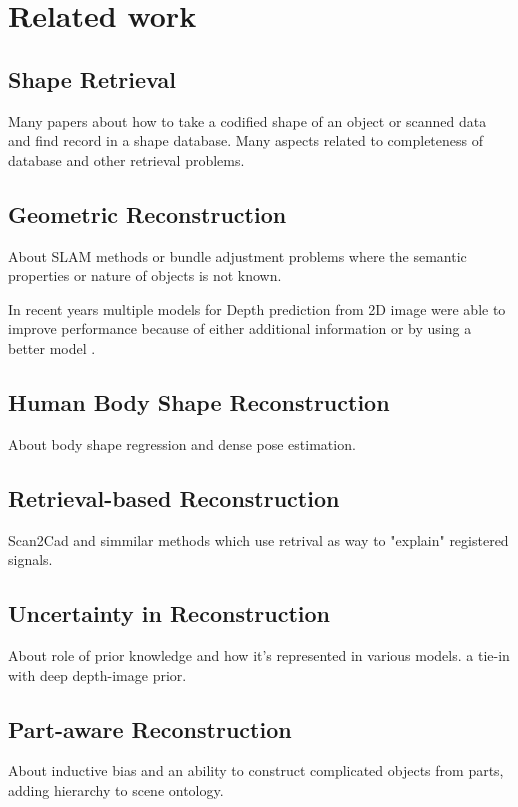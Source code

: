 \chapter{Related work}

\section{Shape Retrieval}
\label{sec:shape_retrieval}

Many papers about how to take a codified shape of an object or scanned data and find record in a shape database. Many aspects related to completeness of database and other retrieval problems.




\section{Geometric Reconstruction}
\label{sec:geometric_reconstruction}

About SLAM methods or bundle adjustment problems where the semantic properties or nature of objects is not known.

In recent years multiple models for Depth prediction from 2D image were able to improve performance because of either additional information or by using a better model \cite{jiao2018look,tatarchenko2019single,kendall2018multi}.

\section{Human Body Shape Reconstruction}
\label{sec:body_reconstruction}

About body shape regression and dense pose estimation.



\section{Retrieval-based Reconstruction}
\label{sec:retrieval_reconstruction}

Scan2Cad and simmilar methods which use retrival as way to "explain" registered signals.

\section{Uncertainty in Reconstruction}
\label{sec:uncertainty_reconstruction}

About role of prior knowledge and how it's represented in various models. a tie-in with deep depth-image prior.

\section{Part-aware Reconstruction}
\label{sec:part_reconstruction}



About inductive bias and an ability to construct complicated objects from parts, adding hierarchy to scene ontology.